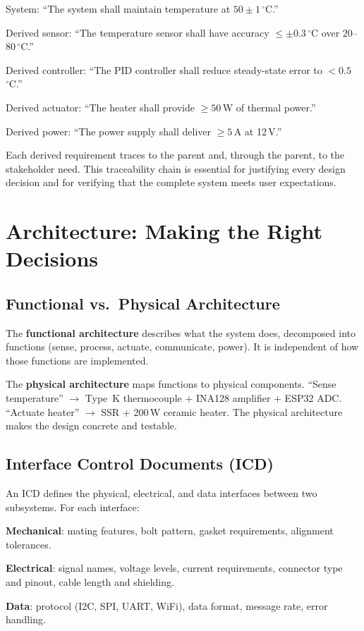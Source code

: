 \documentclass[11pt,letterpaper,twoside,openany]{book}
\newcommand{\degC}{\ensuremath{{}^{\circ}\text{C}}}
\begin{document}
System: ``The system shall maintain temperature at $50 \pm 1$\,\degC{}.''

Derived sensor: ``The temperature sensor shall have accuracy $\leq \pm 0.3$\,\degC{} over $20$--$80$\,\degC{}.''

Derived controller: ``The PID controller shall reduce steady-state error to $< 0.5$\,\degC{}.''

Derived actuator: ``The heater shall provide $\geq 50$\,W of thermal power.''

Derived power: ``The power supply shall deliver $\geq 5$\,A at 12\,V.''

Each derived requirement traces to the parent and, through the parent, to the stakeholder need. This traceability chain is essential for justifying every design decision and for verifying that the complete system meets user expectations.

\section{Architecture: Making the Right Decisions}
\subsection{Functional vs.\ Physical Architecture}
The \textbf{functional architecture} describes what the system does, decomposed into functions (sense, process, actuate, communicate, power). It is independent of how those functions are implemented.

The \textbf{physical architecture} maps functions to physical components. ``Sense temperature'' $\to$ Type~K thermocouple + INA128 amplifier + ESP32 ADC. ``Actuate heater'' $\to$ SSR + 200\,W ceramic heater. The physical architecture makes the design concrete and testable.

\subsection{Interface Control Documents (ICD)}
An ICD defines the physical, electrical, and data interfaces between two subsystems. For each interface:

\textbf{Mechanical}: mating features, bolt pattern, gasket requirements, alignment tolerances.

\textbf{Electrical}: signal names, voltage levels, current requirements, connector type and pinout, cable length and shielding.

\textbf{Data}: protocol (I2C, SPI, UART, WiFi), data format, message rate, error handling.
\end{document}
